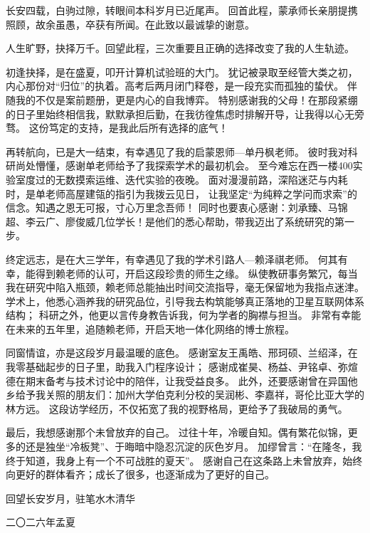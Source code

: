 

长安四载，白驹过隙，转眼间本科岁月已近尾声。
回首此程，蒙承师长亲朋提携照顾，故余虽愚，卒获有所闻。在此致以最诚挚的谢意。

人生旷野，抉择万千。回望此程，三次重要且正确的选择改变了我的人生轨迹。

初逢抉择，是在盛夏，叩开计算机试验班的大门。
犹记被录取至经管大类之初，内心那份对“归位”的执着。高考后两月闭门释卷，是一段充实而孤独的蛰伏。
伴随我的不仅是案前题册，更是内心的自我博弈。
特别感谢我的父母！在那段紧绷的日子里始终相信我，默默承担后勤，在我彷徨焦虑时排解开导，让我得以心无旁骛。
这份笃定的支持，是我此后所有选择的底气！

再转航向，已是大一结束，有幸遇见了我的启蒙恩师—单丹枫老师。
彼时我对科研尚处懵懂，感谢单老师给予了我探索学术的最初机会。
至今难忘在西一楼400实验室度过的无数摸索运维、迭代实验的夜晚。
面对漫漫前路，深陷迷茫与内耗时，是单老师高屋建瓴的指引为我拨云见日，
让我坚定“为纯粹之学问而求索”的信念。知遇之恩无可报，寸心万里念吾师！
同时也要衷心感谢：刘承臻、马锦超、李云广、廖俊威几位学长！是他们的悉心帮助，带我迈出了系统研究的第一步。

终定远志，是在大三学年，有幸遇见了我的学术引路人—赖泽祺老师。
何其有幸，能得到赖老师的认可，开启这段珍贵的师生之缘。
纵使教研事务繁冗，每当我在研究中陷入瓶颈，赖老师总能抽出时间交流指导，毫无保留地为我指点迷津。
学术上，他悉心涵养我的研究品位，引导我去构筑能够真正落地的卫星互联网体系结构；
科研之外，他更以言传身教告诉我，何为学者的胸襟与担当。
非常有幸能在未来的五年里，追随赖老师，开启天地一体化网络的博士旅程。

同窗情谊，亦是这段岁月最温暖的底色。
感谢室友王禹皓、邢珂硕、兰绍泽，在我零基础起步的日子里，助我入门程序设计；
感谢成崔昊、杨益、尹铭卓、弥煊德在期末备考与技术讨论中的陪伴，让我受益良多。
此外，还要感谢曾在异国他乡给予我关照的朋友们：加州大学伯克利分校的吴润彬、李嘉祥，哥伦比亚大学的林方远。
这段访学经历，不仅拓宽了我的视野格局，更给予了我破局的勇气。

最后，我想感谢那个未曾放弃的自己。
过往十年，冷暖自知。偶有繁花似锦，更多的还是独坐“冷板凳”、于晦暗中隐忍沉淀的灰色岁月。
加缪曾言：“在隆冬，我终于知道，我身上有一个不可战胜的夏天”。
感谢自己在这条路上未曾放弃，始终向更好的群体看齐；成长了很多，也逐渐成为了更好的自己。

\par\hfill 回望长安岁月，驻笔水木清华
\par\hfill 二〇二六年孟夏
